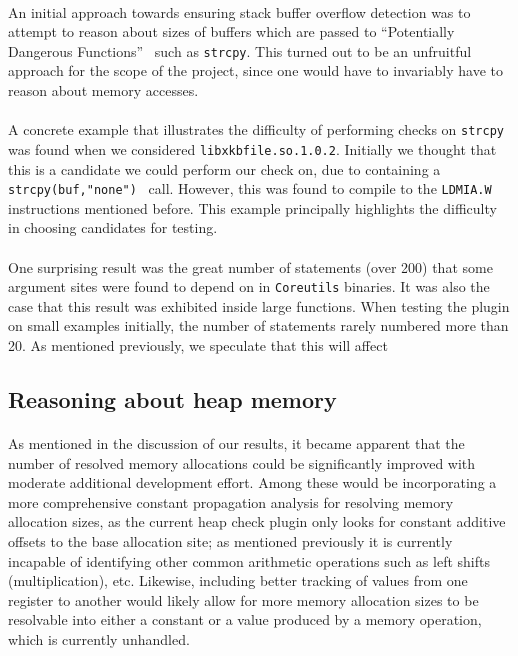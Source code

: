 \documentclass[letterpaper,11pt]{article}
\begin{document}
\paragraph{}
An initial approach towards ensuring stack buffer overflow detection was to
attempt to reason about sizes of buffers which are passed to ``Potentially
Dangerous Functions''~\cite{seacord2008cert} such as \texttt{strcpy}. This
turned out to be an unfruitful approach for the scope of the project, since one
would have to invariably have to reason about memory accesses.

\paragraph{}
A concrete example that illustrates the difficulty of performing checks on
\texttt{strcpy} was found when we considered \texttt{libxkbfile.so.1.0.2}.
Initially we thought that this is a candidate we could perform our check on,
due to containing a \texttt{strcpy(buf,"none")}~\cite{xorg} call. However, this was found
to compile to the \texttt{LDMIA.W} instructions mentioned before. This example
principally highlights the difficulty in choosing candidates for testing.

\paragraph{}
One surprising result was the great number of statements (over
200) that some argument sites were found to depend on in \texttt{Coreutils}
binaries. It was also the case that this result was exhibited inside large
functions. When testing the plugin on small examples initially, the number of
statements rarely numbered more than 20. As mentioned previously, we speculate
that this will affect

\subsection{Reasoning about heap memory}

\paragraph{}
As mentioned in the discussion of our results, it became apparent that the
number of resolved memory allocations could be significantly improved with
moderate additional development effort. Among these would be incorporating a
more comprehensive constant propagation analysis for resolving memory
allocation sizes, as the current heap check plugin only looks for constant
additive offsets to the base allocation site; as mentioned previously it is
currently incapable of identifying other common arithmetic operations such as
left shifts (multiplication), etc. Likewise, including better tracking of
values from one register to another would likely allow for more memory
allocation sizes to be resolvable into either a constant or a value produced by
a memory operation, which is currently unhandled.
\end{document}
